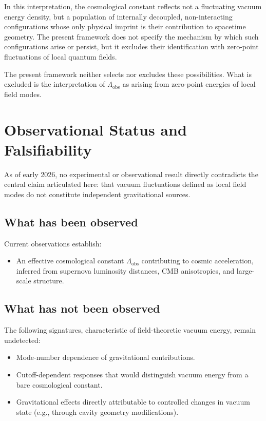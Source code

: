 \documentclass[12pt,letterpaper]{article}
\begin{document}
In this interpretation, the cosmological constant reflects not a fluctuating vacuum energy density, but a population of internally decoupled, non-interacting configurations whose only physical imprint is their contribution to spacetime geometry. The present framework does not specify the mechanism by which such configurations arise or persist, but it excludes their identification with zero-point fluctuations of local quantum fields.

\vspace{0.5cm}

The present framework neither selects nor excludes these possibilities. What is excluded is the interpretation of $\Lambda_{\mathrm{obs}}$ as arising from zero-point energies of local field modes.


\section{Observational Status and Falsifiability}

As of early 2026, no experimental or observational result directly contradicts the central claim articulated here: that vacuum fluctuations defined as local field modes do not constitute independent gravitational sources.

\subsection{What has been observed}

Current observations establish:
\begin{itemize}
\item An effective cosmological constant $\Lambda_{\mathrm{obs}}$ contributing to cosmic acceleration, inferred from supernova luminosity distances, CMB anisotropies, and large-scale structure.
\end{itemize}

\subsection{What has not been observed}

The following signatures, characteristic of field-theoretic vacuum energy, remain undetected:
\begin{itemize}
\item Mode-number dependence of gravitational contributions.
\item Cutoff-dependent responses that would distinguish vacuum energy from a bare cosmological constant.
\item Gravitational effects directly attributable to controlled changes in vacuum state (e.g., through cavity geometry modifications).
\end{itemize}
\end{document}
